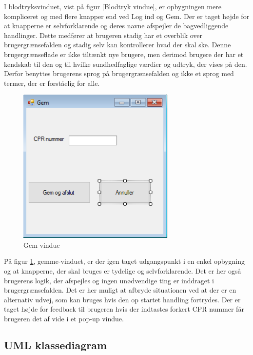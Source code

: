 I blodtryksvinduet, vist på figur \ref{Blodtryk vindue}, er opbygningen mere kompliceret og med flere knapper end ved Log ind og Gem. Der er taget højde for at knapperne er selvforklarende og deres navne afspejler de bagvedliggende handlinger. Dette medfører at brugeren stadig har et overblik over brugergrænsefalden og stadig selv kan kontrollerer hvad der skal ske. Denne brugergrænseflade er ikke tiltænkt nye brugere, men derimod brugere der har et kendskab til den og til hvilke sundhedfaglige værdier og udtryk, der vises på den.  Derfor benyttes brugerens sprog på brugergrænsefalden og ikke et sprog med termer, der er forståelig for alle. 

\begin{figure}[H]
	\centering
	\includegraphics[width=0.7\textwidth]{Figurer/GUI/Gem_GUI}
	\caption{Gem vindue}
	\label{Gem vindue}
\end{figure}

På figur \ref{Gem vindue}, gemme-vinduet, er der igen taget udgangspunkt i en enkel opbygning og at knapperne, der skal bruges er tydelige og selvforklarende. Det er her også brugerens logik, der afspejles og ingen unødvendige ting er inddraget i brugergrænsefalden. Det er her muligt at afbryde situationen ved at der er en alternativ udvej, som kan bruges hvis den op startet handling fortrydes. Der er taget højde for feedback til brugeren hvis der indtastes forkert CPR nummer får brugeren det af vide i et pop-up vindue. 

\subsection{UML klassediagram}

